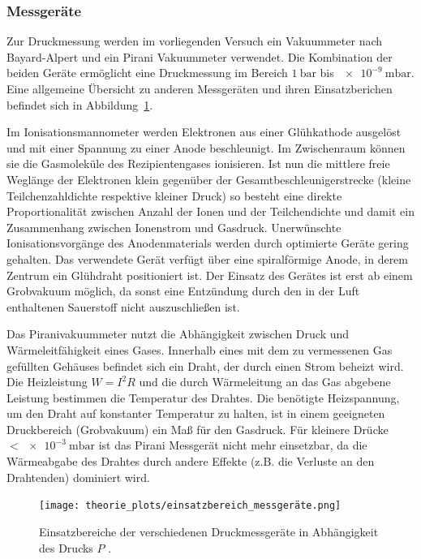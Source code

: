 \subsubsection{Messgeräte}
Zur Druckmessung werden im vorliegenden Versuch ein Vakuummeter nach Bayard-Alpert und ein Pirani Vakuummeter verwendet.
Die Kombination der beiden Geräte ermöglicht eine Druckmessung im Bereich $\SI{1}{\bar}$ bis $\SI{e-9}{\milli\bar}$.
Eine allgemeine Übersicht zu anderen Messgeräten und ihren Einsatzberichen befindet sich in Abbildung~\ref{fig: messgeräte}.

Im Ionisationsmannometer werden Elektronen aus einer Glühkathode ausgelöst und mit einer Spannung zu einer Anode beschleunigt.
Im Zwischenraum können sie die
Gasmoleküle des Rezipientengases ionisieren. Ist nun die mittlere freie Weglänge der Elektronen klein gegenüber der
Gesamtbeschleunigerstrecke (kleine Teilchenzahldichte respektive kleiner Druck) so besteht eine direkte Proportionalität
zwischen Anzahl der Ionen und der Teilchendichte und damit ein Zusammenhang zwischen Ionenstrom und Gasdruck. Unerwünschte
Ionisationsvorgänge des Anodenmaterials werden durch optimierte Geräte gering gehalten. Das verwendete Gerät verfügt über
eine spiralförmige Anode, in derem Zentrum ein Glühdraht positioniert ist. Der Einsatz des Gerätes ist erst ab einem
Grobvakuum möglich, da sonst eine Entzündung durch den in der Luft enthaltenen Sauerstoff nicht auszuschließen ist.

Das Piranivakuummeter nutzt die Abhängigkeit zwischen Druck und Wärmeleitfähigkeit eines Gases. Innerhalb eines mit dem
zu vermessenen Gas gefüllten Gehäuses befindet sich ein Draht, der durch einen Strom beheizt wird. Die Heizleistung
$W = I^2 R$ und die durch Wärmeleitung an das Gas abgebene Leistung bestimmen die Temperatur des Drahtes. Die benötigte
Heizspannung, um den Draht auf konstanter Temperatur zu halten, ist in einem geeigneten Druckbereich (Grobvakuum)
ein Maß für den Gasdruck. Für kleinere Drücke $<\SI{e-3}{\milli\bar}$ ist das Pirani Messgerät nicht mehr einsetzbar, da die
Wärmeabgabe des Drahtes durch andere Effekte (z.B. die Verluste an den Drahtenden) dominiert wird.

\begin{figure}
  \centering
  \texttt{[image: theorie\_plots/einsatzbereich\_messgeräte.png]}
  \caption{Einsatzbereiche der verschiedenen Druckmessgeräte in Abhängigkeit des Drucks $P$ \cite{dem1}.}
  \label{fig: messgeräte}
\end{figure}
\FloatBarrier
